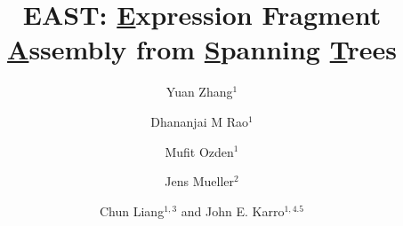 \documentclass[10pt]{bmc_article}
\newenvironment{bmcformat}{\begin{raggedright}\baselineskip20pt\sloppy\setboolean{publ}{false}}{\end{raggedright}\baselineskip20pt\sloppy}
\begin{document}
\begin{bmcformat}

\title{EAST: {\underline E}xpression Fragment {\underline A}ssembly from {\underline S}panning {\underline T}rees}



\author{Yuan Zhang$^1$
  \and
  Dhananjai M Rao$^1$
  \and
  Mufit Ozden$^1$
  \and
  Jens Mueller$^2$
  \and
  Chun Liang\correspondingauthor$^{1,3}$
  and
  John E. Karro\correspondingauthor$^{1,4.5}$
}


\address{
    \iid(1)Department of Computer Science and Software Engineering,  \\
    \iid(2)Informational Technology Services
    \iid(3)Department of Botanty, \\
    \iid(4)Department of Microbiology, \\
    \iid(5)Department of Statistics, Miami University, Oxford OHIO, USA
}

\maketitle




\end{bmcformat}
\end{document}
